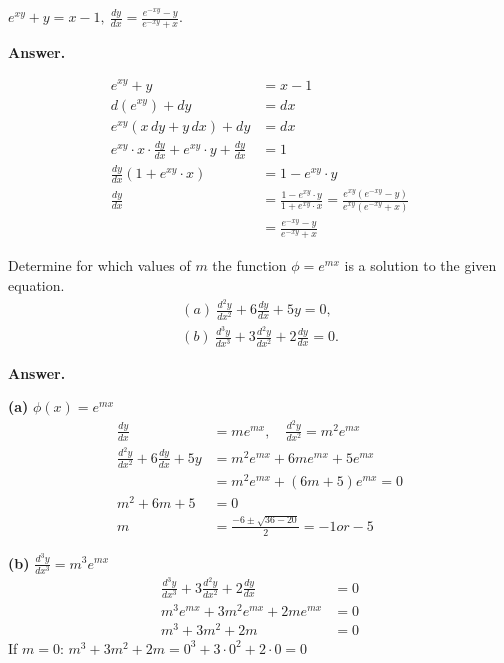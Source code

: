 \documentclass[12pt]{article}
\newenvironment{Answer}{%
  \par\medskip\noindent
  \begin{list}{}{%
    \setlength{\leftmargin}{0pt}%
    \setlength{\itemindent}{0pt}%
    \setlength{\listparindent}{0pt}%
  }%
  \item\relax
  \textbf{Answer.}\quad\ignorespaces
}{%
  \end{list}
  \par\medskip
}
\begin{document}
\begin{enumerate}[label=\textbf{\arabic*.}, leftmargin=*]
  \item[11.] $\displaystyle e^{xy}+y=x-1,\ \frac{dy}{dx}=\frac{e^{-xy}-y}{e^{-xy}+x}$.
  \begin{Answer}
  \begin{align*}
    e^{xy} + y &= x - 1 \\[0.3em]
    d(e^{xy}) + dy &= dx \\[0.3em]
    e^{xy}(x \, dy + y \, dx) + dy &= dx \\[0.3em]
    \displaystyle e^{xy} \cdot x \cdot \frac{dy}{dx} + e^{xy} \cdot y + \frac{dy}{dx} &= 1 \\[0.3em]
    \displaystyle \frac{dy}{dx}(1 + e^{xy} \cdot x) &= 1 - e^{xy} \cdot y \\[0.3em]
    \displaystyle \frac{dy}{dx} &= \displaystyle \frac{1 - e^{xy} \cdot y}{1 + e^{xy} \cdot x} = \frac{e^{xy}(e^{-xy} - y)}{e^{xy}(e^{-xy} + x)} \\[0.3em]
    &= \displaystyle \frac{e^{-xy} - y}{e^{-xy} + x}
  \end{align*}
  \end{Answer}

  \item[20.] Determine for which values of $m$ the function $\phi=e^{mx}$ is a solution to the given equation.
  \[ \begin{array}{l}
    (a)\ \displaystyle \frac{d^{2}y}{dx^{2}}+6\frac{dy}{dx}+5y=0, \\[4pt]
    (b)\ \displaystyle \frac{d^{3}y}{dx^{3}}+3\frac{d^{2}y}{dx^{2}}+2\frac{dy}{dx}=0.
  \end{array} \]
  \begin{Answer}
  \textbf{(a)} \quad \(\phi(x) = e^{mx}\)
  \begin{align*}
    \displaystyle \frac{dy}{dx} &= m e^{mx}, \quad \frac{d^2y}{dx^2} = m^2 e^{mx} \\[0.4em]
    \displaystyle \frac{d^2y}{dx^2} + 6\frac{dy}{dx} + 5y &= m^2 e^{mx} + 6m e^{mx} + 5e^{mx} \\[0.3em]
    &= m^2 e^{mx} + (6m + 5)e^{mx} = 0 \\[0.4em]
    m^2 + 6m + 5 &= 0 \\[0.3em]
    m &= \frac{-6 \pm \sqrt{36 - 20}}{2} = -1  or -5
  \end{align*}

  \vspace{0.2em}
  \textbf{(b)} \quad \(\displaystyle \frac{d^3y}{dx^3} = m^3 e^{mx}\)
  \begin{align*}
    \displaystyle \frac{d^3y}{dx^3} + 3\frac{d^2y}{dx^2} + 2\frac{dy}{dx} &= 0 \\[0.3em]
    m^3 e^{mx} + 3m^2 e^{mx} + 2m e^{mx} &= 0 \\[0.3em]
    m^3 + 3m^2 + 2m &= 0
  \end{align*}
   If \(m = 0\): \quad \(m^3 + 3m^2 + 2m = 0^3 + 3 \cdot 0^2 + 2 \cdot 0 = 0\)
  

\end{Answer}
\end{enumerate}
\end{document}
